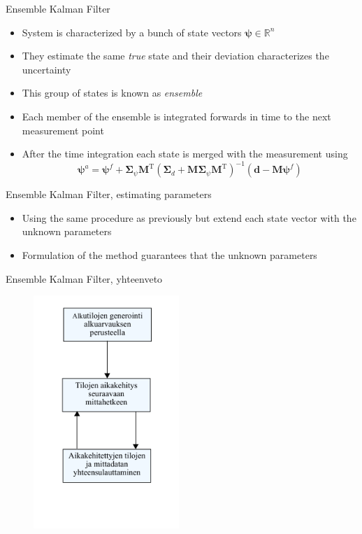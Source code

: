 \documentclass{beamer}
\begin{document}
\begin{frame}{Ensemble Kalman Filter}

\begin{itemize}
\item System is characterized by a bunch of state vectors $\boldsymbol{\psi} \in \mathbb{R}^n$
\item They estimate the same \emph{true} state and their deviation characterizes the uncertainty
\item This group of states is known as \emph{ensemble} 
\item Each member of the ensemble is integrated forwards in time to the next measurement point
\item After the time integration each state is merged with the measurement using
\[
\boldsymbol{\psi}^a = \boldsymbol{\psi}^f + \boldsymbol{\Sigma}_\psi \mathbf{M}^\mathrm{T} \left(\boldsymbol{\Sigma}_d+\mathbf{M}\boldsymbol{\Sigma}_\psi\mathbf{M}^\mathrm{T}\right)^{-1}\left(\boldsymbol{d}-\mathbf{M}\boldsymbol{\psi}^f\right)
\]
\end{itemize}

\end{frame}

\begin{frame}{Ensemble Kalman Filter, estimating parameters}

\begin{itemize}
\item Using the same procedure as previously but extend each state vector with the unknown parameters
\item Formulation of the method guarantees that the unknown parameters
\end{itemize}

\end{frame}

\begin{frame}{Ensemble Kalman Filter, yhteenveto}

\begin{figure}
\includegraphics[width=5.5cm]{enkf_luuppi.pdf}
\end{figure}

\end{frame}
\end{document}
